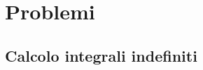 \documentclass[letterpaper,10pt,italian]{jupyterBook}
\begin{document}
\section{Problemi}
\label{\detokenize{ch/infinitesimal_calculus/integrals-problems:problemi}}\label{\detokenize{ch/infinitesimal_calculus/integrals-problems:infinitesimal-calculus-integrals-problems}}\label{\detokenize{ch/infinitesimal_calculus/integrals-problems::doc}}

\subsection{Calcolo integrali indefiniti}
\label{\detokenize{ch/infinitesimal_calculus/integrals-problems:calcolo-integrali-indefiniti}} \label{exercise:ch/infinitesimal_calculus/integrals-problems-exercise-0}
\end{document}

